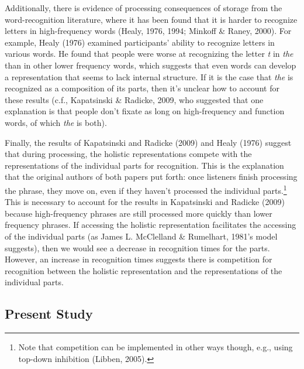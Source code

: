 \documentclass[
  man,floatsintext]{apa6}
\begin{document}
Additionally, there is evidence of processing consequences of storage from the word-recognition literature, where it has been found that it is harder to recognize letters in high-frequency words (Healy, 1976, 1994; Minkoff \& Raney, 2000). For example, Healy (1976) examined participants' ability to recognize letters in various words. He found that people were worse at recognizing the letter \emph{t} in \emph{the} than in other lower frequency words, which suggests that even words can develop a representation that seems to lack internal structure. If it is the case that \emph{the} is recognized as a composition of its parts, then it's unclear how to account for these results (c.f., Kapatsinski \& Radicke, 2009, who suggested that one explanation is that people don't fixate as long on high-frequency and function words, of which \emph{the} is both).

Finally, the results of Kapatsinski and Radicke (2009) and Healy (1976) suggest that during processing, the holistic representations compete with the representations of the individual parts for recognition. This is the explanation that the original authors of both papers put forth: once listeners finish processing the phrase, they move on, even if they haven't processed the individual parts.\footnote{Note that competition can be implemented in other ways though, e.g., using top-down inhibition (Libben, 2005).} This is necessary to account for the results in Kapatsinski and Radicke (2009) because high-frequency phrases are still processed more quickly than lower frequency phrases. If accessing the holistic representation facilitates the accessing of the individual parts (as James L. McClelland \& Rumelhart, 1981's model suggests), then we would see a decrease in recognition times for the parts. However, an increase in recognition times suggests there is competition for recognition between the holistic representation and the representations of the individual parts.

\subsection{Present Study}\label{present-study}
\end{document}
